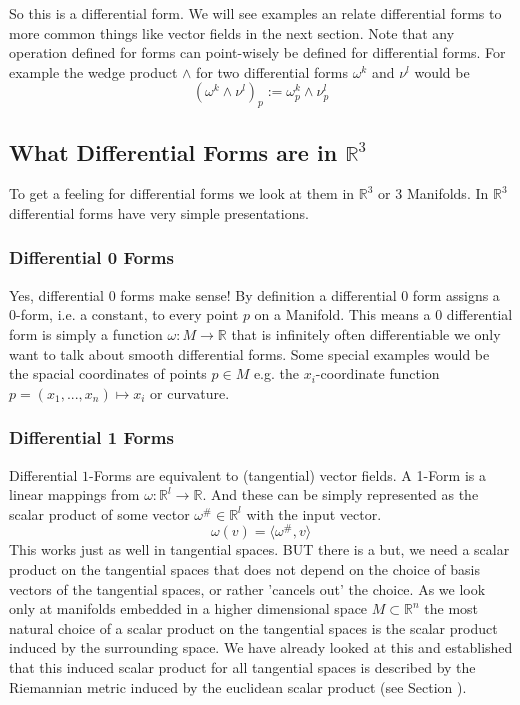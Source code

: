 So this is a differential form. We will see examples an relate differential forms to more common things like vector fields in the next section. Note that any operation defined for forms can point-wisely be defined for differential forms. For example the wedge product $\wedge$ for two differential forms $\omega^k$ and $\nu^l$ would be
\[(\omega^k\wedge \nu^l)_p := \omega^k_p\wedge \nu^l_p\]


\subsection{What Differential Forms are in $\mathbb{R}^3$}
To get a feeling for differential forms we look at them in $\mathbb R^3$ or 3 Manifolds. In $\mathbb R^3$ differential forms have very simple presentations.

\subsubsection{Differential 0 Forms}
Yes, differential 0 forms make sense! By definition a differential 0 form assigns a 0-form, i.e. a constant, to every point $p$ on a Manifold. This means a 0 differential form is simply a function $\omega: M \to \mathbb R$ that is infinitely  often differentiable we only want to talk about smooth differential forms. Some special examples would be the spacial coordinates of points $p \in M$ e.g. the $x_i$-coordinate function $ p = (x_1,...,x_n) \mapsto x_i$ or curvature.


\subsubsection*{Differential 1 Forms}
Differential $1$-Forms are equivalent to (tangential) vector fields. A 1-Form is a linear mappings from $\omega: \mathbb R^l \rightarrow \mathbb R$. And these can be simply represented as the scalar product of some vector $\omega^{\#} \in \mathbb R ^l$ with the input vector.
\[\omega(v) = \langle \omega^{\#}, v \rangle\]
This works just as well in tangential spaces. BUT there is a but, we need a scalar product on the tangential spaces that does not depend on the choice of basis vectors of the tangential spaces, or rather 'cancels out' the choice. As we look only at manifolds embedded in a higher dimensional space $M \subset \mathbb R^n$ the most natural choice of a scalar product on the tangential spaces is the scalar product induced by the surrounding space. We have already looked at this and established that this induced scalar product for all tangential spaces is described by the Riemannian metric induced by the euclidean scalar product (see Section ). 

